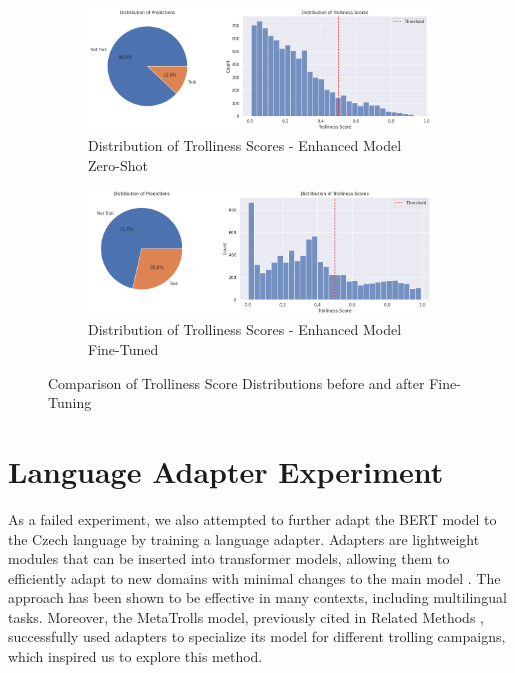 \documentclass[twoside]{ctuthesis}
\theoremstyle{plain}
\theoremstyle{definition}
\theoremstyle{note}
\begin{document}
\begin{figure}[H]
    \centering
    \begin{subfigure}{0.8\linewidth}
        \centering
        \includegraphics[width=\linewidth]{figures/distribution_enhanced.png}
        \caption{Distribution of Trolliness Scores - Enhanced Model Zero-Shot}
        \label{fig:distribution_enhanced}
    \end{subfigure}

    \vspace{1em}

    \begin{subfigure}{0.8\linewidth}
        \centering
        \includegraphics[width=\linewidth]{figures/distribution_enhanced_finetuned.png}
        \caption{Distribution of Trolliness Scores - Enhanced Model Fine-Tuned}
        \label{fig:distribution_enhanced_finetuned}
    \end{subfigure}

    \caption{Comparison of Trolliness Score Distributions before and after Fine-Tuning}
    \label{fig:distribution_comparison_enhanced}
\end{figure}

\section{Language Adapter Experiment}
As a failed experiment, we also attempted to further adapt the BERT model to the Czech language by training a language adapter. Adapters are lightweight modules that can be inserted into transformer models, allowing them to efficiently adapt to new domains with minimal changes to the main model \cite{Houlsby2019}. The approach has been shown to be effective in many contexts, including multilingual tasks. Moreover, the MetaTrolls model, previously cited in Related Methods \cite{Tian2023}, successfully used adapters to specialize its model for different trolling campaigns, which inspired us to explore this method.\par
\end{document}
